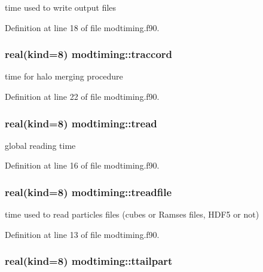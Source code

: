 time used to write output files 



Definition at line 18 of file modtiming.\-f90.

\hypertarget{classmodtiming_a9b8eac461e18e3b6c057420bae5b004e}{
\subsubsection[{traccord}]{\setlength{\rightskip}{0pt plus 5cm}real(kind=8) modtiming\-::traccord}}\label{classmodtiming_a9b8eac461e18e3b6c057420bae5b004e}


time for halo merging procedure 



Definition at line 22 of file modtiming.\-f90.

\hypertarget{classmodtiming_ab77d3fc2a7e3da662677204c1c8f7e84}{
\subsubsection[{tread}]{\setlength{\rightskip}{0pt plus 5cm}real(kind=8) modtiming\-::tread}}\label{classmodtiming_ab77d3fc2a7e3da662677204c1c8f7e84}


global reading time 



Definition at line 16 of file modtiming.\-f90.

\hypertarget{classmodtiming_ab585192644ed79fc1030fde80dd84f85}{
\subsubsection[{treadfile}]{\setlength{\rightskip}{0pt plus 5cm}real(kind=8) modtiming\-::treadfile}}\label{classmodtiming_ab585192644ed79fc1030fde80dd84f85}


time used to read particles files (cubes or Ramses files, H\-D\-F5 or not) 



Definition at line 13 of file modtiming.\-f90.

\hypertarget{classmodtiming_a65a8925f0685c0a5c5e42b0afd3b4a69}{
\subsubsection[{ttailpart}]{\setlength{\rightskip}{0pt plus 5cm}real(kind=8) modtiming\-::ttailpart}}\label{classmodtiming_a65a8925f0685c0a5c5e42b0afd3b4a69}



